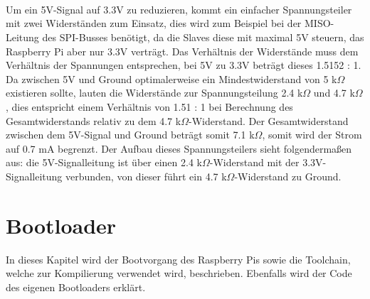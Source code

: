 \documentclass[12pt]{article}
\begin{document}
\\\\\\Um ein 5V-Signal auf 3.3V zu reduzieren, kommt ein einfacher Spannungsteiler mit zwei Widerständen zum Einsatz, dies wird zum Beispiel bei der MISO-Leitung des SPI-Busses benötigt, da die Slaves diese mit maximal 5V steuern, das Raspberry Pi aber nur 3.3V verträgt. Das Verhältnis der Widerstände muss dem Verhältnis der Spannungen entsprechen, bei 5V zu 3.3V beträgt dieses 1.5152 : 1. Da zwischen 5V und Ground optimalerweise ein Mindestwiderstand von 5 k$\Omega$ existieren sollte, lauten die Widerstände zur Spannungsteilung 2.4 k$\Omega$ und 4.7 k$\Omega$, dies entspricht einem Verhältnis von 1.51 : 1 bei Berechnung des Gesamtwiderstands relativ zu dem 4.7 k$\Omega$-Widerstand. Der Gesamtwiderstand zwischen dem 5V-Signal und Ground beträgt somit 7.1 k$\Omega$, somit wird der Strom auf 0.7 mA begrenzt. Der Aufbau dieses Spannungsteilers sieht folgendermaßen aus: die 5V-Signalleitung ist über einen 2.4 k$\Omega$-Widerstand mit der 3.3V-Signalleitung verbunden, von dieser führt ein 4.7 k$\Omega$-Widerstand zu Ground. 
\newpage\section{Bootloader}
In dieses Kapitel wird der Bootvorgang des Raspberry Pis sowie die Toolchain, welche zur Kompilierung verwendet wird, beschrieben. Ebenfalls wird der Code des eigenen Bootloaders erklärt.
\end{document}
